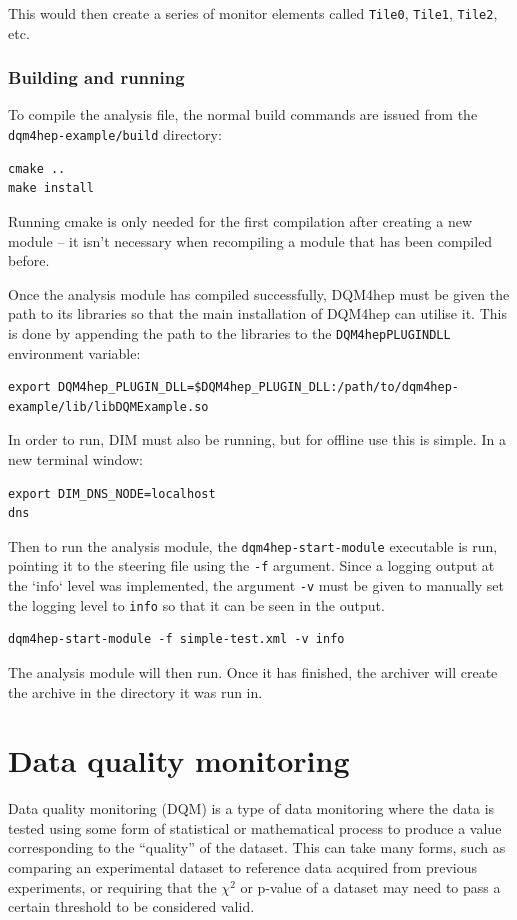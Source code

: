 This would then create a series of monitor elements called \texttt{Tile0}, \texttt{Tile1}, \texttt{Tile2}, etc.

\subsubsection{Building and running}
To compile the analysis file, the normal build commands are issued from the \texttt{dqm4hep-example/build} directory:

\begin{lstlisting}
cmake ..
make install
\end{lstlisting}

Running cmake is only needed for the first compilation after creating a new module – it isn't necessary when recompiling a module that has been compiled before.

Once the analysis module has compiled successfully, \acrshort{DQM4hep} must be given the path to its libraries so that the main installation of \acrshort{DQM4hep} can utilise it. This is done by appending the path to the libraries to the \texttt{DQM4hep\textunderscore PLUGIN\textunderscore DLL} environment variable:

\begin{lstlisting}
export DQM4hep_PLUGIN_DLL=$DQM4hep_PLUGIN_DLL:/path/to/dqm4hep-example/lib/libDQMExample.so
\end{lstlisting}

In order to run, \acrshort{DIM} must also be running, but for offline use this is simple. In a new terminal window:

\begin{lstlisting}
export DIM_DNS_NODE=localhost
dns
\end{lstlisting}

Then to run the analysis module, the \texttt{dqm4hep-start-module} executable is run, pointing it to the steering file using the \texttt{-f} argument. Since a logging output at the `info` level was implemented, the argument \texttt{-v} must be given to manually set the logging level to \texttt{info} so that it can be seen in the output.

\begin{lstlisting}
dqm4hep-start-module -f simple-test.xml -v info
\end{lstlisting}

The analysis module will then run. Once it has finished, the archiver will create the archive in the directory it was run in.

\section{Data quality monitoring}
Data quality monitoring (\acrshort{DQM}) is a type of data monitoring where the data is tested using some form of statistical or mathematical process to produce a value corresponding to the ``quality'' of the dataset. This can take many forms, such as comparing an experimental dataset to reference data acquired from previous experiments, or requiring that the $\chi^2$ or p-value of a dataset may need to pass a certain threshold to be considered valid.

